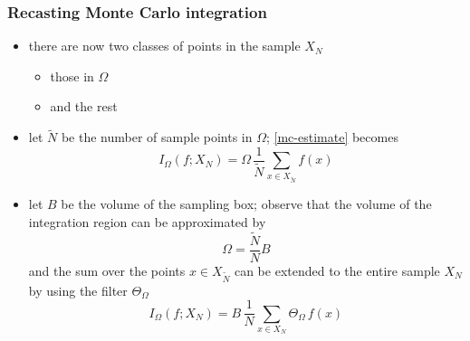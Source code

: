 \begin{frame}
%
  \frametitle{Recasting Monte Carlo integration}
%
  \begin{itemize}
%
  \item there are now two classes of points in the sample $X_{N}$
    \begin{itemize}
    \item those in $\Omega$
    \item and the rest
    \end{itemize}
%
  \item let $\tilde{N}$ be the number of sample points in $\Omega$; \eqref{mc-estimate} becomes
    \begin{equation}
      I_{\Omega} (f; X_{N})
      =
      \Omega \, \frac{1}{\tilde{N}} \sum_{x \in X_{\tilde{N}}} f(x)
      \label{eq:mc-box}
    \end{equation}
%
  \item let $B$ be the volume of the sampling box; observe that the volume of the integration
    region can be approximated by
    \begin{equation}
      \Omega = \frac{\tilde{N}}{N} B
    \end{equation}
%
    and the sum over the points $x \in X_{\tilde{N}}$ can be extended to the entire sample
    $X_{N}$ by using the filter $\Theta_{\Omega}$
%
    \begin{equation}
      I_{\Omega} (f; X_{N})
      =
      B \, \frac{1}{N} \sum_{x \in X_{N}} \Theta_{\Omega} \, f(x)
    \end{equation}
%
  \end{itemize}
%
\end{frame}


